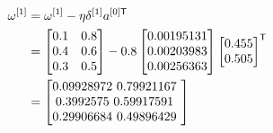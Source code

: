 \documentclass{article}
\begin{document}
\[
    \begin{aligned}
        \omega^{[1]} & =\omega^{[1]}-\eta\delta^{[1]}a^{[0]\mathsf{T}} \\
                     & =\begin{bmatrix}
                            0.1 & 0.8 \\
                            0.4 & 0.6 \\
                            0.3 & 0.5 \\
                        \end{bmatrix}
        - 0.8 \begin{bmatrix}
                  0.00195131 \\
                  0.00203983 \\
                  0.00256363 \\
              \end{bmatrix}
        \begin{bmatrix}
            0.455 \\
            0.505 \\
        \end{bmatrix}^{\mathsf{T}}                               \\
                     & = \begin{bmatrix}
                             0.09928972 $ 0.79921167 $ \\
                             0.3992575  $ 0.59917591 $ \\
                             0.29906684 $ 0.49896429 $ \\
                         \end{bmatrix}
    \end{aligned}
\]
\end{document}
